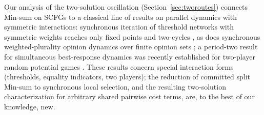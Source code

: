 Our analysis of the two-solution oscillation (Section~\ref{sec:tworoutes}) connects Min-sum on SCFGs to a classical line of results on parallel dynamics with symmetric interactions: synchronous iteration of threshold networks with symmetric weights reaches only fixed points and two-cycles \citep{GolesOlivos80}, as does synchronous weighted-plurality opinion dynamics over finite opinion sets \citep{PoljakSura83}; a period-two result for simultaneous best-response dynamics was recently established for two-player random potential games \citep{AshkenaziGolan25}. These results concern special interaction forms (thresholds, equality indicators, two players); the reduction of committed split Min-sum to synchronous local selection, and the resulting two-solution characterization for arbitrary shared pairwise cost terms, are, to the best of our knowledge, new.

